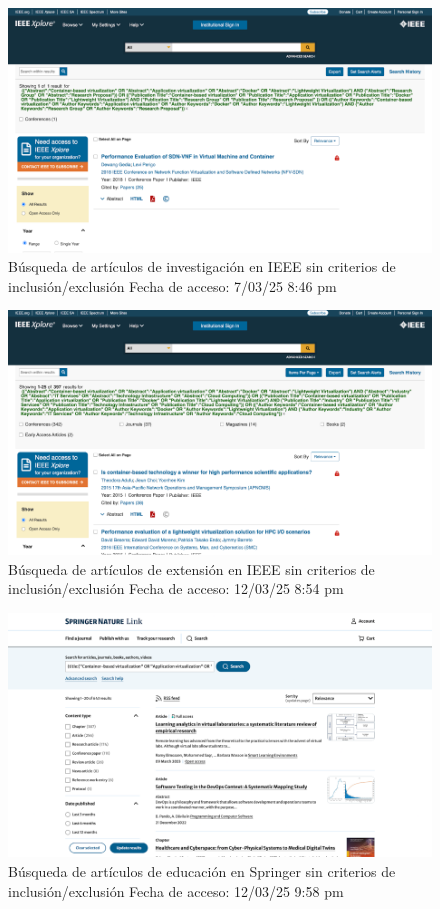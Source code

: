 \FloatBarrier\begin{figure}[H]
    \centering
    \includegraphics[width=\textwidth,keepaspectratio]{apendices/BD/sin-criterios/IEEE-inv.png}
    \caption{Búsqueda de artículos de investigación en IEEE sin criterios de inclusión/exclusión
    Fecha de acceso: 7/03/25 8:46 pm
    }\label{fig:busqueda5}
\end{figure}
\FloatBarrier\begin{figure}[H]
    \centering
    \includegraphics[width=\textwidth,keepaspectratio]{apendices/BD/sin-criterios/IEEE-ind.png}
    \caption{Búsqueda de artículos de extensión en IEEE sin criterios de inclusión/exclusión
    Fecha de acceso: 12/03/25 8:54 pm
    }\label{fig:busqueda6}
\end{figure}
\FloatBarrier\begin{figure}[H]
    \centering
    \includegraphics[width=\textwidth,keepaspectratio]{apendices/BD/sin-criterios/Springer-ed.png}
    \caption{Búsqueda de artículos de educación en Springer sin criterios de inclusión/exclusión
    Fecha de acceso: 12/03/25 9:58 pm
    }\label{fig:busqueda7}
\end{figure}
